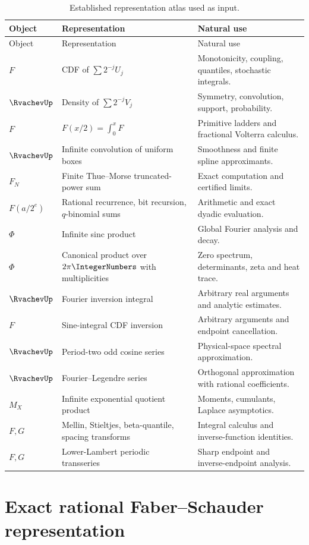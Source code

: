 \documentclass[11pt]{article}
\theoremstyle{definition}
\theoremstyle{remark}
\begin{document}
\begin{longtable}{@{}p{}p{}p{}@{}}
\caption{Established representation atlas used as input.}\label{p8:tab:atlas}\\
\toprule
Object & Representation & Natural use \\
\midrule
\endfirsthead
\toprule
Object & Representation & Natural use \\
\midrule
\endhead
$F$ & CDF of $\sum2^{-j}U_j$ & Monotonicity, coupling, quantiles, stochastic integrals.\\
$\RvachevUp$ & Density of $\sum2^{-j}V_j$ & Symmetry, convolution, support, probability.\\
$F$ & $F(x/2)=\int_0^xF$ & Primitive ladders and fractional Volterra calculus.\\
$\RvachevUp$ & Infinite convolution of uniform boxes & Smoothness and finite spline approximants.\\
$F_N$ & Finite Thue--Morse truncated-power sum & Exact computation and certified limits.\\
$F(a/2^e)$ & Rational recurrence, bit recursion, $q$-binomial sums & Arithmetic and exact dyadic evaluation.\\
$\Phi$ & Infinite sinc product & Global Fourier analysis and decay.\\
$\Phi$ & Canonical product over $2\pi\IntegerNumbers$ with multiplicities & Zero spectrum, determinants, zeta and heat trace.\\
$\RvachevUp$ & Fourier inversion integral & Arbitrary real arguments and analytic estimates.\\
$F$ & Sine-integral CDF inversion & Arbitrary arguments and endpoint cancellation.\\
$\RvachevUp$ & Period-two odd cosine series & Physical-space spectral approximation.\\
$\RvachevUp$ & Fourier--Legendre series & Orthogonal approximation with rational coefficients.\\
$M_X$ & Infinite exponential quotient product & Moments, cumulants, Laplace asymptotics.\\
$F,G$ & Mellin, Stieltjes, beta-quantile, spacing transforms & Integral calculus and inverse-function identities.\\
$F,G$ & Lower-Lambert periodic transseries & Sharp endpoint and inverse-endpoint analysis.\\
\bottomrule
\end{longtable}

\section{Exact rational Faber--Schauder representation}
\label{p8:sec:faber}
\end{document}
